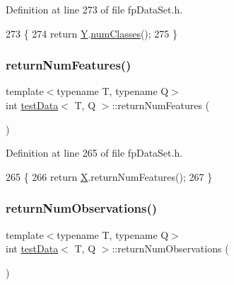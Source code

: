 Definition at line 273 of file fp\+Data\+Set.\+h.


\begin{DoxyCode}
273                              \{
274             \textcolor{keywordflow}{return} \hyperlink{classtestData_a97961fe071062be1146fcbcb1aaf7a00}{Y}.\hyperlink{classinputYDataClassification_ae090531ab57b174ab007a2a8248462fe}{numClasses}();
275         \}
\end{DoxyCode}
\mbox{\label{classtestData_a5ccc979935f93a18f7a35977a7715dbe}} 
\subsubsection{\texorpdfstring{return\+Num\+Features()}{returnNumFeatures()}}
{\footnotesize\ttfamily template$<$typename T, typename Q$>$ \\
int \hyperlink{classtestData}{test\+Data}$<$ T, Q $>$\+::return\+Num\+Features (\begin{DoxyParamCaption}{ }\end{DoxyParamCaption})\hspace{0.3cm}{\ttfamily [inline]}}



Definition at line 265 of file fp\+Data\+Set.\+h.


\begin{DoxyCode}
265                                       \{
266             \textcolor{keywordflow}{return} \hyperlink{classtestData_aaed20c168b252c39fb9dc56757315eee}{X}.returnNumFeatures();
267         \}
\end{DoxyCode}
\mbox{\label{classtestData_a7b7ea4d5b03144b691e909730d70ce62}} 
\subsubsection{\texorpdfstring{return\+Num\+Observations()}{returnNumObservations()}}
{\footnotesize\ttfamily template$<$typename T, typename Q$>$ \\
int \hyperlink{classtestData}{test\+Data}$<$ T, Q $>$\+::return\+Num\+Observations (\begin{DoxyParamCaption}{ }\end{DoxyParamCaption})\hspace{0.3cm}{\ttfamily [inline]}}



